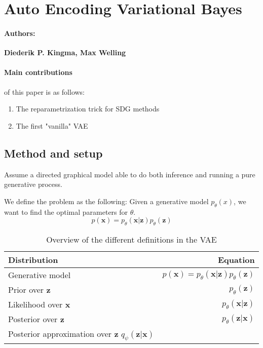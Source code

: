 \section{Auto Encoding Variational Bayes}
\paragraph{Authors:} \textbf{Diederik P. Kingma, Max Welling} \cite{kingma_auto-encoding_2014}

\paragraph{Main contributions} of this paper is as follows:
\begin{enumerate}
    \item The reparametrization trick for SDG methods
    \item The first "vanilla" VAE
\end{enumerate}

\subsection{Method and setup}

Assume a directed graphical model able to do both inference and running a pure generative process. 

We define the problem as the following: 
Given a generative model $p_\theta(x)$, we want to find the optimal parameters for $\theta$. 
\begin{equation}
    p(\mathbf{x}) = p_\theta(\mathbf{x}|\mathbf{z}) p_\theta(\mathbf{z})
    \label{eq:vae-generative}
\end{equation}



\begin{table}
    \label{tab:}
    \centering
    \begin{tabular}{l|r}
      
        Distribution & Equation  \\
        \hline
        Generative model & 
        \(p(\mathbf{x}) = p_\theta(\mathbf{x}|\mathbf{z}) p_\theta(\mathbf{z})\)
        \\
        Prior over \(\mathbf{z}\) &
        \(p_\theta(\mathbf{z})\) 
        \\
        Likelihood over \(\mathbf{x}\) & 
        \( p_\theta(\mathbf{x}|\mathbf{z}) \)
        \\
        Posterior over \(\mathbf{z}\) & 
        \(p_\theta(\mathbf{z}|\mathbf{x})\)
        \\ 
        Posterior approximation over \(\mathbf{z}\) 
        \(q_\psi(\mathbf{z}|\mathbf{x})\)
    \end{tabular}
    
    \caption{Overview of the different definitions in the VAE}
\end{table}

